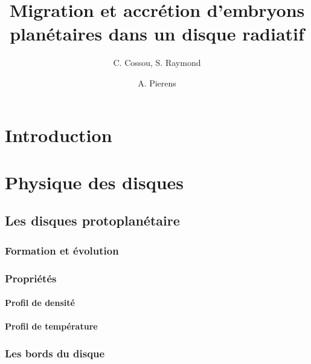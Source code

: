 \documentclass[a4paper,twoside]{report}
\title{Migration et accrétion d'embryons planétaires dans un disque radiatif}
\author{C. Cossou, S. Raymond \and A. Pierens}
\begin{document}
\tableofcontents
\newpage



\chapter*{Introduction}





\chapter{Physique des disques}
\section{Les disques protoplanétaire}
\subsection{Formation et évolution}
\subsection{Propriétés}
\subsubsection{Profil de densité}
\subsubsection{Profil de température}

\subsection{Les bords du disque}
\end{document}
